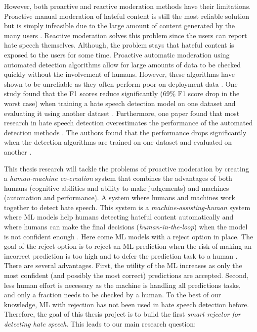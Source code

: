 However, both proactive and reactive moderation methods have their limitations. Proactive manual moderation of hateful content is still the most reliable solution but is simply infeasible due to the large amount of content generated by the many users \cite{balayn2021automatic}. Reactive moderation solves this problem since the users can report hate speech themselves. Although, the problem stays that hateful content is exposed to the users for some time. Proactive automatic moderation using automated detection algorithms allow for large amounts of data to be checked quickly without the involvement of humans. However, these algorithms have shown to be unreliable as they often perform poor on deployment data \cite{balayn2021automatic, grondahl2018all}. One study found that the F1 scores reduce significantly (69\% F1 score drop in the worst case) when training a hate speech detection model on one dataset and evaluating it using another dataset \cite{grondahl2018all}. Furthermore, one paper found that most research in hate speech detection overestimates the performance of the automated detection methods \cite{arango2019hate}. The authors found that the performance drops significantly when the detection algorithms are trained on one dataset and evaluated on another \cite{arango2019hate}.

This thesis research will tackle the problems of proactive moderation by creating a \textit{human-machine co-creation} \cite{woo2020future} system that combines the advantages of both humans (cognitive abilities and ability to make judgements) and machines (automation and performance). A system where humans and machines work together to detect hate speech. This system is a \textit{machine-assisting-human} system where ML models help humans detecting hateful content automatically and where humans can make the final decisions (\textit{human-in-the-loop}) when the model is not confident enough \cite{woo2020future}. Here come ML models with a reject option in place. The goal of the reject option is to reject an ML prediction when the risk of making an incorrect prediction is too high and to defer the prediction task to a human \cite{hendrickx2021machine}. There are several advantages. First, the utility of the ML increases as only the most confident (and possibly the most correct) predictions are accepted. Second, less human effort is necessary as the machine is handling all predictions tasks, and only a fraction needs to be checked by a human. To the best of our knowledge, ML with rejection has not been used in hate speech detection before. Therefore, the goal of this thesis project is to build the first \textit{smart rejector for detecting hate speech}. This leads to our main research question:

